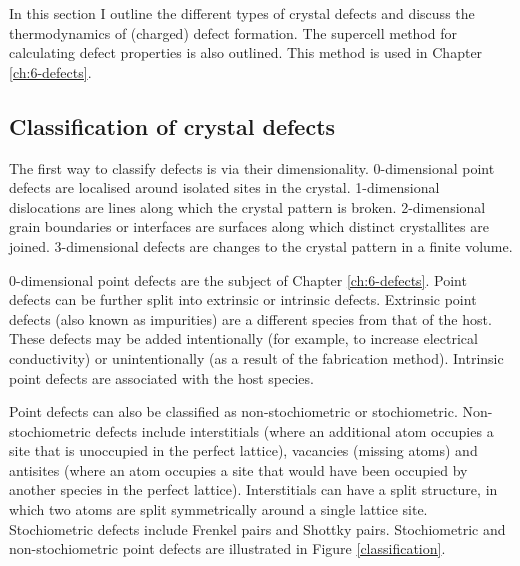 In this section I outline the different types of crystal defects and discuss the thermodynamics of (charged) defect formation. The supercell method for calculating defect properties is also outlined. This method is used in Chapter \ref{ch:6-defects}.



\subsection{Classification of crystal defects}

The first way to classify defects is via their dimensionality. 0-dimensional point defects are localised around isolated sites in the crystal. 1-dimensional dislocations are lines along which the crystal pattern is broken. 2-dimensional grain boundaries or interfaces are surfaces along which distinct crystallites are joined. 3-dimensional defects are changes to the crystal pattern in a finite volume. 

0-dimensional point defects are the subject of Chapter \ref{ch:6-defects}. Point defects can be further split into extrinsic or intrinsic defects. Extrinsic point defects (also known as impurities) are a different species from that of the host. These defects may be added intentionally (for example, to increase electrical conductivity) or unintentionally (as a result of the fabrication method). Intrinsic point defects are associated with the host species.

Point defects can also be classified as non-stochiometric or stochiometric. Non-stochiometric defects include interstitials (where an additional atom occupies a site that is unoccupied in the perfect lattice), vacancies (missing atoms) and antisites (where an atom occupies a site that would have been occupied by another species in the perfect lattice). Interstitials can have a split structure, in which two atoms are split symmetrically around a single lattice site. Stochiometric defects include Frenkel pairs and Shottky pairs. Stochiometric and non-stochiometric point defects are illustrated in Figure \ref{classification}.

